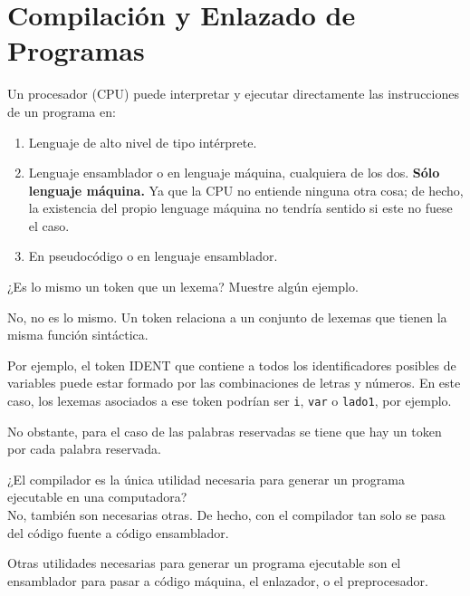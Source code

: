 \section{Compilación y Enlazado de Programas}


\begin{ejercicio}\label{ej:3.Ejercicio1}
    Un procesador (CPU) puede interpretar y ejecutar directamente las instrucciones de un programa en:
    
    \begin{enumerate}[label=(\alph*)]
      \item Lenguaje de alto nivel de tipo intérprete.
      \item Lenguaje ensamblador o en lenguaje máquina, cualquiera de los dos.
      \myitem \textbf{Sólo lenguaje máquina.} \newline
      Ya que la CPU no entiende ninguna otra cosa; de hecho, la existencia del propio lenguage máquina no tendría sentido si este no fuese el caso.
      \item En pseudocódigo o en lenguaje ensamblador.
    \end{enumerate}
    
\end{ejercicio}

\begin{ejercicio} \label{ej:3.Ejercicio2}
    ¿Es lo mismo un token que un lexema? Muestre algún ejemplo.


    No, no es lo mismo. Un token relaciona a un conjunto de lexemas que tienen la misma función sintáctica.

    Por ejemplo, el token IDENT que contiene a todos los identificadores posibles de variables puede estar formado por las combinaciones de letras y números. En este caso, los lexemas asociados a ese token podrían ser \verb|i|, \verb|var| o \verb|lado1|, por ejemplo.


    No obstante, para el caso de las palabras reservadas se tiene que hay un token por cada palabra reservada.
\end{ejercicio}

\begin{ejercicio}\label{ej:3.Ejercicio3}
    ¿El compilador es la única utilidad necesaria para generar un programa ejecutable en una computadora?\\

    No, también son necesarias otras. De hecho, con el compilador tan solo se pasa del código fuente a código ensamblador.
    
    Otras utilidades necesarias para generar un programa ejecutable son el ensamblador para pasar a código máquina, el enlazador, o el preprocesador.

    
\end{ejercicio}

